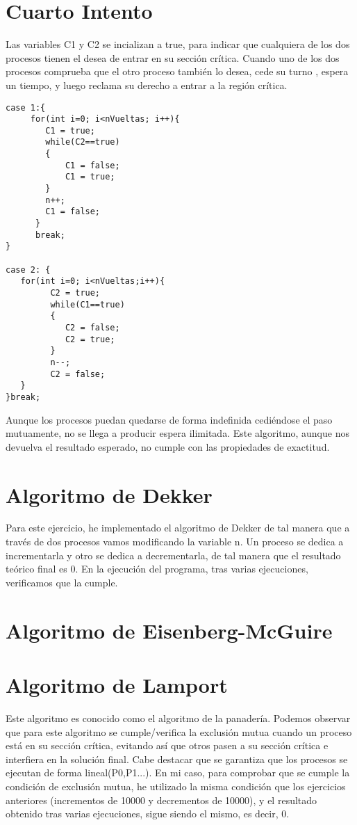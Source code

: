 \documentclass{article}
\begin{document}
\section{Cuarto Intento}
Las variables C1 y C2 se incializan a true, para indicar que cualquiera de los dos procesos tienen el desea de entrar en su sección crítica. Cuando uno de los dos procesos comprueba que el otro proceso también lo desea, cede su turno , espera un tiempo, y luego reclama su derecho a entrar a la región crítica. 
\hfill \break
\begin{verbatim}
case 1:{
     for(int i=0; i<nVueltas; i++){
        C1 = true;
        while(C2==true)
        {
        	C1 = false;
        	C1 = true;        				
        }        			
        n++;
        C1 = false;        	      
      }
      break;
}

case 2: {
   for(int i=0; i<nVueltas;i++){
         C2 = true;
         while(C1==true)
         {
            C2 = false;
            C2 = true;
         }        	      
         n--;
         C2 = false;
   }
}break;

\end{verbatim}
\hfill \break
\hfill \break
Aunque los procesos puedan quedarse de forma indefinida cediéndose el paso mutuamente, no se llega a producir espera ilimitada.
Este algoritmo, aunque nos devuelva el resultado esperado, no cumple con las propiedades de exactitud.


\section{Algoritmo de Dekker}
Para este ejercicio, he implementado el algoritmo de Dekker de tal manera que a través de dos procesos vamos modificando la variable n.
Un proceso se dedica a incrementarla y otro se dedica a decrementarla, de tal manera que el resultado teórico final es 0.
En la ejecución del programa, tras varias ejecuciones, verificamos que la cumple.

\section{Algoritmo de Eisenberg-McGuire}


\section{Algoritmo de Lamport}
Este algoritmo es conocido como el algoritmo de la panadería. 
Podemos observar que para este algoritmo se cumple/verifica la exclusión mutua cuando un proceso está en su sección crítica, evitando así que otros pasen a su sección crítica e interfiera en la solución final.
Cabe destacar que se garantiza que los procesos se ejecutan de forma lineal(P0,P1...).
En mi caso, para comprobar que se cumple la condición de exclusión mutua, he utilizado la misma condición que los ejercicios anteriores (incrementos de 10000 y decrementos de 10000), y el resultado obtenido tras varias ejecuciones, sigue siendo el mismo, es decir, 0.
\end{document}

